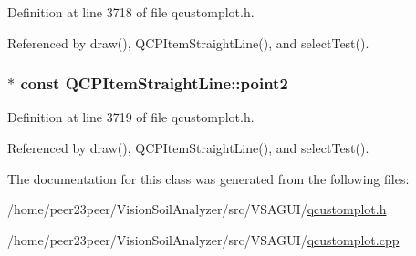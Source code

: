Definition at line 3718 of file qcustomplot.\+h.



Referenced by draw(), Q\+C\+P\+Item\+Straight\+Line(), and select\+Test().

\hypertarget{class_q_c_p_item_straight_line_ad26c0a732e471f63f75d481dcd48cfc9}{}
\subsubsection[{point2}]{$\ast$ const Q\+C\+P\+Item\+Straight\+Line\+::point2}\label{class_q_c_p_item_straight_line_ad26c0a732e471f63f75d481dcd48cfc9}


Definition at line 3719 of file qcustomplot.\+h.



Referenced by draw(), Q\+C\+P\+Item\+Straight\+Line(), and select\+Test().



The documentation for this class was generated from the following files\+:\begin{DoxyCompactItemize}
\item 
/home/peer23peer/\+Vision\+Soil\+Analyzer/src/\+V\+S\+A\+G\+U\+I/\hyperlink{qcustomplot_8h}{qcustomplot.\+h}\item 
/home/peer23peer/\+Vision\+Soil\+Analyzer/src/\+V\+S\+A\+G\+U\+I/\hyperlink{qcustomplot_8cpp}{qcustomplot.\+cpp}\end{DoxyCompactItemize}
